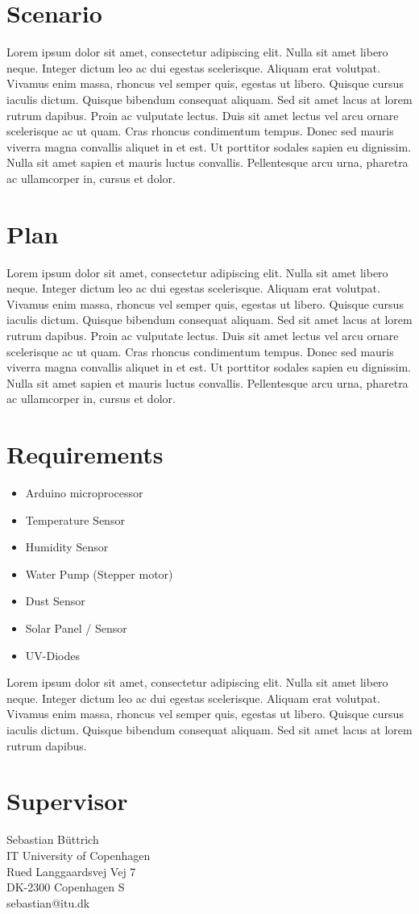 \documentclass{ubicomp2012}
\begin{document}
\section{Scenario}
Lorem ipsum dolor sit amet, consectetur adipiscing elit. Nulla sit amet libero neque. Integer dictum leo ac dui egestas scelerisque. Aliquam erat volutpat. Vivamus enim massa, rhoncus vel semper quis, egestas ut libero. Quisque cursus iaculis dictum. Quisque bibendum consequat aliquam. Sed sit amet lacus at lorem rutrum dapibus. Proin ac vulputate lectus. Duis sit amet lectus vel arcu ornare scelerisque ac ut quam. Cras rhoncus condimentum tempus. Donec sed mauris viverra magna convallis aliquet in et est. Ut porttitor sodales sapien eu dignissim. Nulla sit amet sapien et mauris luctus convallis. Pellentesque arcu urna, pharetra ac ullamcorper in, cursus et dolor.

\section{Plan}
Lorem ipsum dolor sit amet, consectetur adipiscing elit. Nulla sit amet libero neque. Integer dictum leo ac dui egestas scelerisque. Aliquam erat volutpat. Vivamus enim massa, rhoncus vel semper quis, egestas ut libero. Quisque cursus iaculis dictum. Quisque bibendum consequat aliquam. Sed sit amet lacus at lorem rutrum dapibus. Proin ac vulputate lectus. Duis sit amet lectus vel arcu ornare scelerisque ac ut quam. Cras rhoncus condimentum tempus. Donec sed mauris viverra magna convallis aliquet in et est. Ut porttitor sodales sapien eu dignissim. Nulla sit amet sapien et mauris luctus convallis. Pellentesque arcu urna, pharetra ac ullamcorper in, cursus et dolor.

\section{Requirements}
\begin{itemize}
\item Arduino microprocessor
\item Temperature Sensor
\item Humidity Sensor
\item Water Pump (Stepper motor)
\item Dust Sensor
\item Solar Panel / Sensor
\item UV-Diodes 
\end{itemize}

Lorem ipsum dolor sit amet, consectetur adipiscing elit. Nulla sit amet libero neque. Integer dictum leo ac dui egestas scelerisque. Aliquam erat volutpat. Vivamus enim massa, rhoncus vel semper quis, egestas ut libero. Quisque cursus iaculis dictum. Quisque bibendum consequat aliquam. Sed sit amet lacus at lorem rutrum dapibus.

\section{Supervisor}
Sebastian Büttrich\\
IT University of Copenhagen\\
Rued Langgaardsvej Vej 7\\
DK-2300 Copenhagen S\\
sebastian@itu.dk

\nocite{example-journal,example-abstracts,example-conference2}



\end{document}
